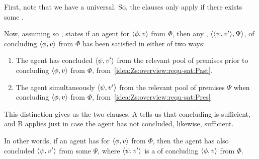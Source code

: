 \begin{note}
  First, note that we have a universal.
  So, the clauses only apply if there exists some \requ{}.

  Now, assuming so \requ{}, \iCS{} states if an agent \csV{} for \(\langle \phi, v \rangle\) from \(\Phi\), then any \requ{}, \(\langle \langle \psi, v' \rangle, \Psi \rangle\), of concluding \(\langle \phi, v \rangle\) from \(\Phi\) has been satisfied in either of two ways:

  \begin{enumerate}[label=\alph*.]
  \item
    The agent has concluded \(\langle \psi, v' \rangle\) from the relevant pool of premises prior to concluding \(\langle \phi, v \rangle\) from \(\Phi\), from~\ref{idea:Zs:overview:requ-sat:Past}.
  \item
    The agent simultaneously \csN{} \(\langle \psi, v' \rangle\) from the relevant pool of premises \(\Psi\) when concluding \(\langle \phi, v \rangle\) from \(\Phi\), from~\ref{idea:Zs:overview:requ-sat:Pres}
  \end{enumerate}

  This distinction gives us the two clauses.
  A tells us that concluding is sufficient, and B applies just in case the agent has not concluded, likewise, sufficient.

  In other words, if an agent has \csVed{} for \(\langle \phi, v \rangle\) from \(\Phi\), then the agent has also concluded \(\langle \psi, v' \rangle\) from some \(\Psi\), where \(\langle \psi, v' \rangle\) is a \requ{} of concluding \(\langle \phi, v \rangle\) from \(\Phi\).
\end{note}

